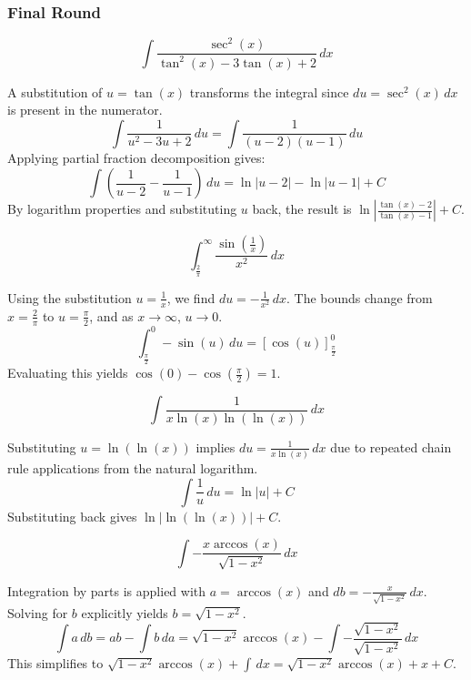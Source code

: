\subsubsection*{Final Round}
\begin{questions}
    \question \[ \int\frac{\sec^{2}(x)}{\tan^{2}(x)-3\tan(x)+2} \,dx \]
    \begin{solution}
        A substitution of $u=\tan(x)$ transforms the integral since $du=\sec^{2}(x) \,dx$ is present in the numerator.
        \[ \int\frac{1}{u^{2}-3u+2} \,du = \int\frac{1}{(u-2)(u-1)} \,du \]
        Applying partial fraction decomposition gives:
        \[ \int \left( \frac{1}{u-2} - \frac{1}{u-1} \right) \,du = \ln|u-2| - \ln|u-1| + C \]
        By logarithm properties and substituting $u$ back, the result is $\ln\left|\frac{\tan(x)-2}{\tan(x)-1}\right|+C$.
    \end{solution}

    \question \[ \int_{\frac{2}{\pi}}^{\infty}\frac{\sin\left(\frac{1}{x}\right)}{x^{2}} \,dx \]
    \begin{solution}
        Using the substitution $u=\frac{1}{x}$, we find $du=-\frac{1}{x^{2}} \,dx$. The bounds change from $x=\frac{2}{\pi}$ to $u=\frac{\pi}{2}$, and as $x \to \infty$, $u \to 0$.
        \[ \int_{\frac{\pi}{2}}^{0} -\sin(u) \,du = \left[ \cos(u) \right]_{\frac{\pi}{2}}^{0} \]
        Evaluating this yields $\cos(0) - \cos\left(\frac{\pi}{2}\right) = 1$.
    \end{solution}

    \question \[ \int\frac{1}{x\ln(x)\ln(\ln(x))} \,dx \]
    \begin{solution}
        Substituting $u=\ln(\ln(x))$ implies $du=\frac{1}{x\ln(x)} \,dx$ due to repeated chain rule applications from the natural logarithm.
        \[ \int\frac{1}{u} \,du = \ln|u| + C \]
        Substituting back gives $\ln|\ln(\ln(x))|+C$.
    \end{solution}

    \question \[ \int-\frac{x\arccos(x)}{\sqrt{1-x^{2}}} \,dx \]
    \begin{solution}
        Integration by parts is applied with $a=\arccos(x)$ and $db=-\frac{x}{\sqrt{1-x^{2}}} \,dx$.
        Solving for $b$ explicitly yields $b=\sqrt{1-x^{2}}$.
        \[ \int a \,db = ab - \int b \,da = \sqrt{1-x^{2}}\arccos(x) - \int-\frac{\sqrt{1-x^{2}}}{\sqrt{1-x^{2}}} \,dx \]
        This simplifies to $\sqrt{1-x^{2}}\arccos(x) + \int \,dx = \sqrt{1-x^{2}}\arccos(x) + x + C$.
    \end{solution}


\end{questions}
